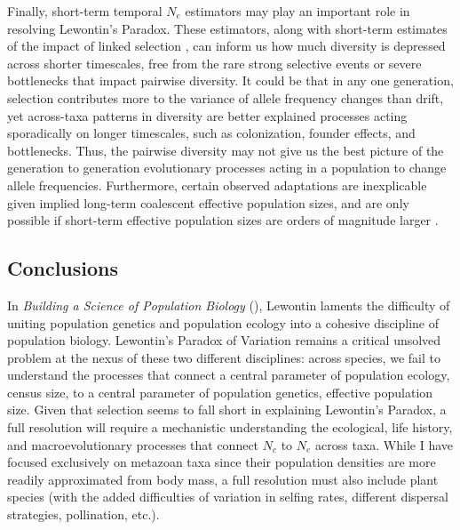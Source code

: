 \documentclass[9pt,lineno]{elife}
\begin{document}
Finally, short-term temporal $N_e$ estimators may play an important role in
resolving Lewontin's Paradox. These estimators, along with short-term estimates
of the impact of linked selection \citep{Buffalo2019-qs,Buffalo2020-my},
can inform us how much diversity is depressed across shorter timescales, free
from the rare strong selective events or severe bottlenecks that impact
pairwise diversity. It could be that in any one generation, selection
contributes more to the variance of allele frequency changes than drift, yet
across-taxa patterns in diversity are better explained processes acting
sporadically on longer timescales, such as colonization, founder effects, and
bottlenecks. Thus, the pairwise diversity may not give us the best picture of
the generation to generation evolutionary processes acting in a population to
change allele frequencies. Furthermore, certain observed adaptations are
inexplicable given implied long-term coalescent effective population sizes, and
are only possible if short-term effective population sizes are orders of
magnitude larger \citep{Karasov2010-fb,Barton2010-pi}.

\subsection{Conclusions}

In \emph{Building a Science of Population Biology}
(\citeyear{Lewontin2004-fb}), Lewontin laments the difficulty of uniting
population genetics and population ecology into a cohesive discipline of
population biology. Lewontin's Paradox of Variation remains a critical unsolved
problem at the nexus of these two different disciplines: across species, we
fail to understand the processes that connect a central parameter of population
ecology, census size, to a central parameter of population genetics, effective
population size. Given that selection seems to fall short in explaining
Lewontin's Paradox, a full resolution will require a mechanistic understanding
the ecological, life history, and macroevolutionary processes that connect
$N_c$ to $N_e$ across taxa. While I have focused exclusively on metazoan taxa
since their population densities are more readily approximated from body mass,
a full resolution must also include plant species (with the added difficulties
of variation in selfing rates, different dispersal strategies, pollination,
etc.).
\end{document}
